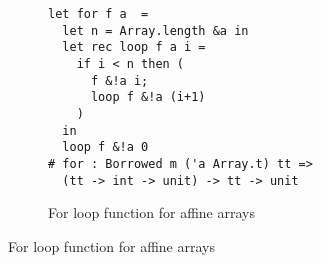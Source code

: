 \begin{figure}
  \centering
  \begin{subfigure}{0.5\linewidth}
\begin{lstlisting}
let for f a  = 
  let n = Array.length &a in
  let rec loop f a i = 
    if i < n then (
      f &!a i;
      loop f &!a (i+1)
    )
  in
  loop f &!a 0
# for : Borrowed m ('a Array.t) tt =>
  (tt -> int -> unit) -> tt -> unit
\end{lstlisting}
    \caption{For loop function for affine arrays}
    \label{ex:array:for}
  \end{subfigure}
\end{figure}

